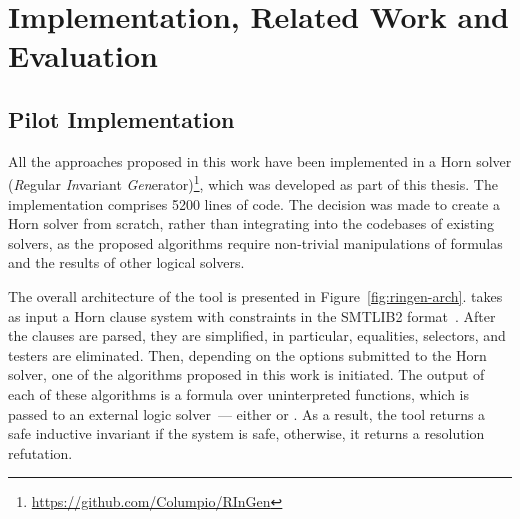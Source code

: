 \chapter{Implementation, Related Work and Evaluation}\label{ch:evaluation}

\section{Pilot Implementation}
All the approaches proposed in this work have been implemented in a Horn solver \theringen{} (\emph{R}egular \emph{In}variant \emph{Gen}erator)\footnote{\url{https://github.com/Columpio/RInGen}}, which was developed as part of this thesis. The implementation comprises 5200 lines of \fsharp{} code. The decision was made to create a Horn solver from scratch, rather than integrating into the codebases of existing solvers, as the proposed algorithms require non-trivial manipulations of formulas and the results of other logical solvers.


The overall architecture of the tool is presented in Figure~\ref{fig:ringen-arch}.
\theringen{} takes as input a Horn clause system with constraints in the SMTLIB2 format~\cite{BarFT-RR-17}.
After the clauses are parsed, they are simplified, in particular, equalities, selectors, and testers are eliminated. Then, depending on the options submitted to the Horn solver, one of the algorithms proposed in this work is initiated. The output of each of these algorithms is a formula over uninterpreted functions, which is passed to an external logic solver~--- either \vampire{} or \cvc{}.
As a result, the tool returns a safe inductive invariant if the system is safe, otherwise, it returns a resolution refutation.

